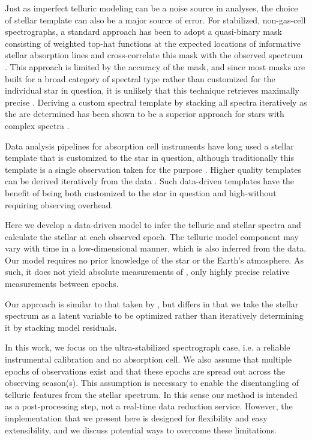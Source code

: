 \documentclass[modern]{aastex62}
\begin{document}
Just as imperfect telluric modeling can be a noise source in \EPRV analyses, the choice of stellar template can also be a major source of error. 
For stabilized, non-gas-cell \RV spectrographs, a standard approach has been to adopt a quasi-binary mask consisting of weighted top-hat functions at the expected locations of informative stellar absorption lines and cross-correlate this mask with the observed spectrum \citep[e.g.][]{Baranne1979, Pepe2002}. 
This approach is limited by the accuracy of the mask, and since most masks are built for a broad category of spectral type rather than customized for the individual star in question, it is unlikely that this technique retrieves maximally precise \RVs. 
Deriving a custom spectral template by stacking all spectra iteratively as the \RVs are determined has been shown to be a superior approach for stars with complex spectra \citep{AngladaEscude2012, Zechmeister2018}. 

Data analysis pipelines for absorption cell instruments have long used a stellar template that is customized to the star in question, although traditionally this template is a single observation taken for the purpose \citep[e.g.][]{Butler1996}. 
Higher quality templates can be derived iteratively from the data \citep{Sato2002, Gao2016}. 
Such data-driven templates have the benefit of being both customized to the star in question and high-\SNR without requiring observing overhead. 


Here we develop a data-driven model to infer the telluric and stellar spectra and calculate the stellar \RV at each observed epoch. 
The telluric model component may vary with time in a low-dimensional manner, which is also inferred from the data. 
Our model requires no prior knowledge of the star or the Earth's atmosphere. 
As such, it does not yield absolute measurements of \RVs, only highly precise relative measurements between epochs. 

Our approach is similar to that taken by \citet{Gao2016}, but differs in that we take the stellar spectrum as a latent variable to be optimized rather than iteratively determining it by stacking model residuals. 

In this work, we focus on the ultra-stabilized spectrograph case, i.e. a reliable instrumental calibration and no absorption cell. 
We also assume that multiple epochs of observations exist and that these epochs are spread out across the observing season(s). 
This assumption is necessary to enable the disentangling of telluric features from the stellar spectrum. 
In this sense our method is intended as a post-processing step, not a real-time data reduction service. 
However, the implementation that we present here is designed for flexibility and easy extensibility, and we discuss potential ways to overcome these limitations.
\end{document}
